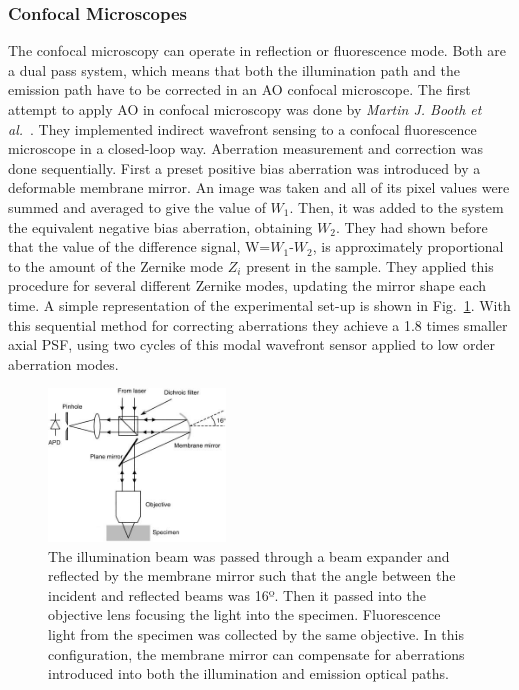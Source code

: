 \subsubsection{Confocal Microscopes}
\label{sec:ConfocalMicroscopes}

The confocal microscopy can operate in reflection or fluorescence mode. Both are a dual pass system, which means that both the illumination path and the emission path have to be corrected in an AO confocal microscope. The first attempt to apply AO in confocal microscopy was done by \textit{Martin J. Booth et al.}~\cite{scan_CFM}. They implemented indirect wavefront sensing to a confocal fluorescence microscope in a closed-loop way. Aberration measurement and correction was done sequentially. First a preset positive bias aberration was introduced by a deformable membrane mirror. An image was taken and all of its pixel values were summed and averaged to give the value of $W_1$. Then, it was added to the system the equivalent negative bias aberration, obtaining $W_2$. They had shown before that the value of the difference signal, W=$W_1$-$W_2$, is approximately proportional to the amount of the Zernike mode $Z_i$ present in the sample. They applied this procedure for several different Zernike modes, updating the mirror shape each time. A simple representation of the experimental set-up is shown in Fig.~\ref{fig:AOM_scan_CFM}. With this sequential method for correcting aberrations they achieve a 1.8 times smaller axial PSF, using two cycles of this modal wavefront sensor applied to low order aberration modes.

\begin{figure}[!htbp]
	\centering
		\includegraphics[width=0.42\textwidth,height=0.22\textheight]{images/AOM_scan_CFM.jpg}
		\caption{The illumination beam was passed through a beam expander and reflected by the membrane mirror such that the angle between the incident and reflected beams was 16º. Then it passed into the objective lens focusing the light into the specimen. Fluorescence light from the specimen was collected by the same objective. In this configuration, the membrane mirror can compensate for aberrations introduced into both the illumination and emission optical paths.}
	\label{fig:AOM_scan_CFM}
\end{figure}

